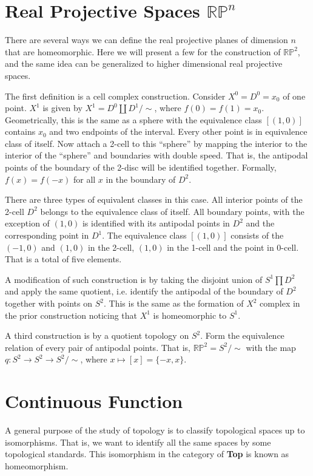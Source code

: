 \documentclass[article,11pt, reqno]{article}
\theoremstyle{remark}
\newcommand{\tb}{\textbf}
\newcommand{\mb}{\mathbb}
\newcommand{\<}{\langle}
\renewcommand{\>}{\rangle}
\begin{document}
\section{Real Projective Spaces $\mb{RP}^n$}
There are several ways we can define the real projective planes of dimension $n$ that are homeomorphic. Here we will present a few for the construction of $\mb{RP}^2$, and the same idea can be generalized to higher dimensional real projective spaces.

The first definition is a cell complex construction. Consider $X^0 = D^0 = x_0$ of one point. $X^1$ is given by $X^1 = D^0\coprod D^1/\sim$, where $f(0)=f(1)=x_0$. Geometrically, this is the same as a sphere with the equivalence class $[(1, 0)]$ contains $x_0$ and two endpoints of the interval. Every other point is in equivalence class of itself. Now attach a 2-cell to this ``sphere'' by mapping the interior to the interior of the ``sphere'' and boundaries with double speed. That is, the antipodal points of the boundary of the 2-disc will be identified together. Formally, $f(x)=f(-x)$ for all $x$ in the boundary of $D^2$.

There are three types of equivalent classes in this case. All interior points of the 2-cell $D^2$ belongs to the equivalence class of itself. All boundary points, with the exception of $(1, 0)$ is identified with its antipodal points in $D^2$ and the corresponding point in $D^1$. The equivalence class $[(1, 0)]$ consists of the $(-1, 0)$ and $(1, 0)$ in the 2-cell, $(1, 0)$ in the 1-cell and the point in 0-cell. That is a total of five elements.

A modification of such construction is by taking the disjoint union of $S^1\prod D^2$ and apply the same quotient, i.e. identify the antipodal of the boundary of $D^2$ together with points on $S^2$. This is the same as the formation of $X^2$ complex in the prior construction noticing that $X^1$ is homeomorphic to $S^1$.


A third construction is by a quotient topology on $S^2$. Form the equivalence relation of every pair of antipodal points. That is, $\mb{RP}^2= S^2/\sim$ with the map $q: S^2\rightarrow S^2\rightarrow S^2/\sim$, where $x\mapsto [x] = \{-x, x\}$.

\section{Continuous Function}
A general purpose of the study of topology is to classify topological spaces up to isomorphisms. That is, we want to identify all the same spaces by some topological standards. This isomorphism in the category of \tb{Top} is known as homeomorphism.
\end{document}
